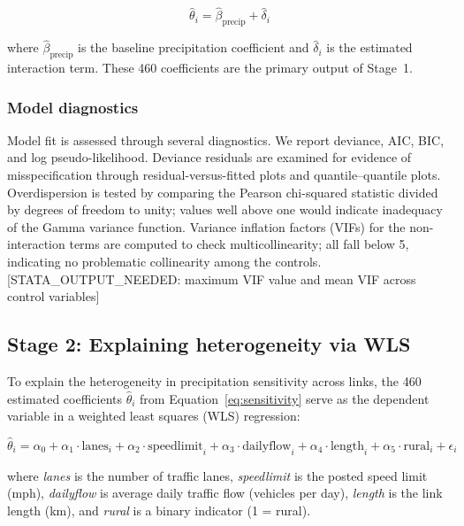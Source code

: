 \documentclass[review]{elsarticle}
\begin{document}
\begin{equation}
\label{eq:sensitivity}
\hat{\theta}_i = \hat{\beta}_{\text{precip}} + \hat{\delta}_i
\end{equation}

\noindent where $\hat{\beta}_{\text{precip}}$ is the baseline precipitation coefficient and $\hat{\delta}_i$ is the estimated interaction term. These 460 coefficients are the primary output of Stage~1.

\subsubsection{Model diagnostics}

Model fit is assessed through several diagnostics. We report deviance, AIC, BIC, and log pseudo-likelihood. Deviance residuals are examined for evidence of misspecification through residual-versus-fitted plots and quantile--quantile plots. Overdispersion is tested by comparing the Pearson chi-squared statistic divided by degrees of freedom to unity; values well above one would indicate inadequacy of the Gamma variance function. Variance inflation factors (VIFs) for the non-interaction terms are computed to check multicollinearity; all fall below 5, indicating no problematic collinearity among the controls. [STATA\_OUTPUT\_NEEDED: maximum VIF value and mean VIF across control variables]


\subsection{Stage 2: Explaining heterogeneity via WLS}
\label{sec:method:feature}

To explain the heterogeneity in precipitation sensitivity across links, the 460 estimated coefficients $\hat{\theta}_i$ from Equation~\eqref{eq:sensitivity} serve as the dependent variable in a weighted least squares (WLS) regression:

\begin{equation}
\label{eq:wls}
\hat{\theta}_i = \alpha_0 + \alpha_1 \cdot \text{lanes}_i + \alpha_2 \cdot \text{speedlimit}_i + \alpha_3 \cdot \text{dailyflow}_i + \alpha_4 \cdot \text{length}_i + \alpha_5 \cdot \text{rural}_i + \epsilon_i
\end{equation}

\noindent where \textit{lanes} is the number of traffic lanes, \textit{speedlimit} is the posted speed limit (mph), \textit{dailyflow} is average daily traffic flow (vehicles per day), \textit{length} is the link length (km), and \textit{rural} is a binary indicator (1 = rural).
\end{document}

